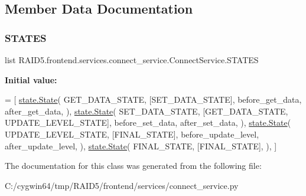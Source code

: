 \subsection{Member Data Documentation}
\mbox{\label{class_r_a_i_d5_1_1frontend_1_1services_1_1connect__service_1_1_connect_service_a142f71d2cf709124f605a8e72729be2a}} 
\subsubsection{\texorpdfstring{S\+T\+A\+T\+ES}{STATES}}
{\footnotesize\ttfamily list R\+A\+I\+D5.\+frontend.\+services.\+connect\+\_\+service.\+Connect\+Service.\+S\+T\+A\+T\+ES\hspace{0.3cm}{\ttfamily [static]}}

{\bfseries Initial value\+:}
\begin{DoxyCode}
=  [
        \hyperlink{classstate_1_1_state}{state.State}(
            GET\_DATA\_STATE,
            [SET\_DATA\_STATE],
            before\_get\_data,
            after\_get\_data,
        ),
        \hyperlink{classstate_1_1_state}{state.State}(
            SET\_DATA\_STATE,
            [GET\_DATA\_STATE, UPDATE\_LEVEL\_STATE],
            before\_set\_data,
            after\_set\_data,
        ),
        \hyperlink{classstate_1_1_state}{state.State}(
            UPDATE\_LEVEL\_STATE,
            [FINAL\_STATE],
            before\_update\_level,
            after\_update\_level,
        ),
        \hyperlink{classstate_1_1_state}{state.State}(
            FINAL\_STATE,
            [FINAL\_STATE],
        ),
    ]
\end{DoxyCode}


The documentation for this class was generated from the following file\+:\begin{DoxyCompactItemize}
\item 
C\+:/cygwin64/tmp/\+R\+A\+I\+D5/frontend/services/connect\+\_\+service.\+py\end{DoxyCompactItemize}
